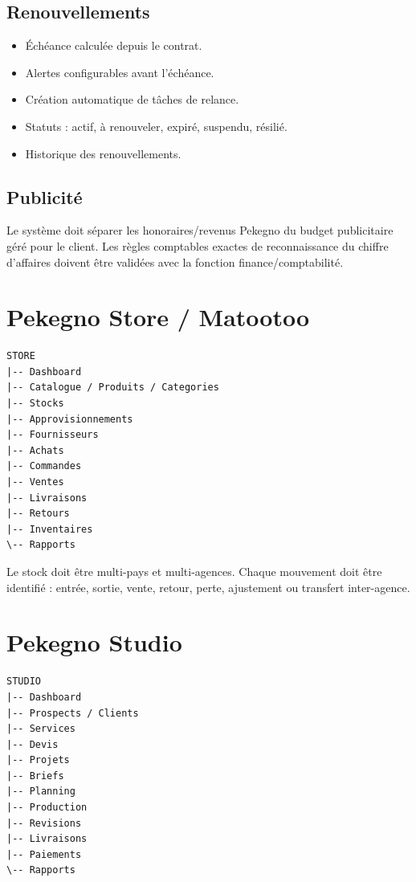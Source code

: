 \documentclass[11pt,a4paper]{article}
\begin{document}
\subsection{Renouvellements}

\begin{itemize}
  \item Échéance calculée depuis le contrat.
  \item Alertes configurables avant l'échéance.
  \item Création automatique de tâches de relance.
  \item Statuts : actif, à renouveler, expiré, suspendu, résilié.
  \item Historique des renouvellements.
\end{itemize}

\subsection{Publicité}

Le système doit séparer les honoraires/revenus Pekegno du budget publicitaire géré pour le client. Les règles comptables exactes de reconnaissance du chiffre d'affaires doivent être validées avec la fonction finance/comptabilité.

\section{Pekegno Store / Matootoo}

\begin{verbatim}
STORE
|-- Dashboard
|-- Catalogue / Produits / Categories
|-- Stocks
|-- Approvisionnements
|-- Fournisseurs
|-- Achats
|-- Commandes
|-- Ventes
|-- Livraisons
|-- Retours
|-- Inventaires
\-- Rapports
\end{verbatim}

Le stock doit être multi-pays et multi-agences. Chaque mouvement doit être identifié : entrée, sortie, vente, retour, perte, ajustement ou transfert inter-agence.

\section{Pekegno Studio}

\begin{verbatim}
STUDIO
|-- Dashboard
|-- Prospects / Clients
|-- Services
|-- Devis
|-- Projets
|-- Briefs
|-- Planning
|-- Production
|-- Revisions
|-- Livraisons
|-- Paiements
\-- Rapports
\end{verbatim}
\end{document}
